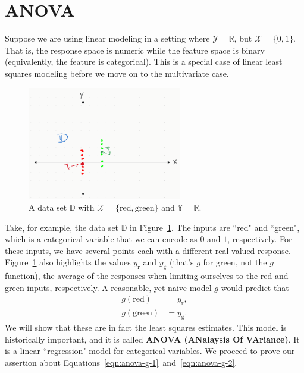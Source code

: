 \documentclass[12pt, a4paper]{article}
\theoremstyle{definition}
\begin{document}
	\section*{ANOVA}
	Suppose we are using linear modeling in a setting where $\mathcal{Y}=\mathbb{R}$,
	but $\mathcal{X} = \{0, 1\}$. That is, the response space is numeric while
	the feature space is binary (equivalently, the feature is categorical). This
	is a special case of linear least squares modeling before we move on to
	the multivariate case.
	\begin{figure}
		\centering
		\includegraphics[width=0.6\textwidth]{anova-dataset}
		\caption{A data set $\mathbb{D}$ with $\mathcal{X}=\{\text{red}, \text{green}\}$ and
		$\mathbb{Y}=\mathbb{R}$.}
		\label{fig:anova-dataset}
	\end{figure}
	Take, for example, the data set $\mathbb{D}$ in Figure~\ref{fig:anova-dataset}. The inputs
	are ``red" and ``green", which is a categorical variable that we can encode as $0$
	and $1$, respectively. For these inputs, we have several points each with a different
	real-valued response. Figure~\ref{fig:anova-dataset} also highlights the values $\bar{y}_{\text{r}}$
	and $\bar{y}_{\text{g}}$ (that's $g$ for green, not the $g$ function), the average of the responses
	when limiting ourselves to the red and green inputs, respectively. A reasonable, yet naive model
	$g$ would predict that
	\begin{align}
		g(\text{red})&=\bar{y}_{\text{r}}\label{eqn:anova-g-1},\\
		g(\text{green})&=\bar{y}_{\text{g}}\label{eqn:anova-g-2}.
	\end{align}
	We will show that these are in fact the least squares estimates.
	This model is historically important, and it is called \textbf{ANOVA (ANalaysis Of VAriance)}.
	It is a linear ``regression" model for categorical variables. We proceed to
	prove our assertion about Equations~\ref{eqn:anova-g-1}~and~\ref{eqn:anova-g-2}.
	
\end{document}

